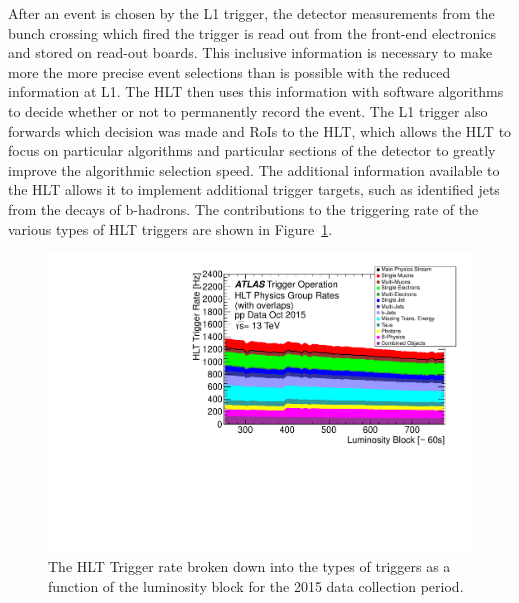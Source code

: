 After an event is chosen by the L1 trigger, the detector measurements from the bunch crossing which fired the trigger is read out from the front-end electronics and stored on read-out boards.
This inclusive information is necessary to make more the more precise event selections than is possible with the reduced information at L1.
The \ac{HLT} then uses this information with software algorithms to decide whether or not to permanently record the event.
The L1 trigger also forwards which decision was made and \acp{RoI} to the \ac{HLT}, which allows the \ac{HLT} to focus on particular algorithms and particular sections of the detector to greatly improve the algorithmic selection speed.
The additional information available to the \ac{HLT} allows it to implement additional trigger targets, such as identified jets from the decays of b-hadrons.
The contributions to the triggering rate of the various types of \ac{HLT} triggers are shown in Figure~\ref{fig:trigger_l1rate}. 

\begin{figure}[hbtp]
\includegraphics[width=\fullfig]{figures/trigger_hltrate.pdf}
\caption{The HLT Trigger rate broken down into the types of triggers as a function of the luminosity block for the 2015 data collection period.}
\label{fig:trigger_l1rate}
\end{figure}

